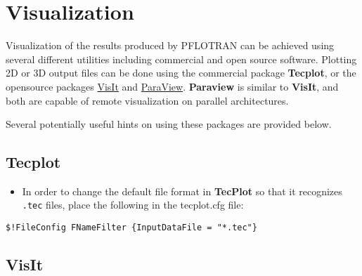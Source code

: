 
\section{Visualization}

Visualization of the results produced by PFLOTRAN can be achieved using several different utilities including commercial and open source software. 
Plotting 2D or 3D output files can be done using the commercial package {\bf Tecplot}, or the opensource packages \href{https://wci.llnl.gov/codes/visit/}{VisIt} and \href{http://www.paraview.org/}{ParaView}. {\bf Paraview} is similar to {\bf VisIt}, and both are capable of remote visualization on parallel architectures.  

Several potentially useful hints on using these packages are provided below.

\subsection{Tecplot}

\begin{itemize}
\item In order to change the default file format in {\bf TecPlot} so that it recognizes {\tt .tec} files, place the following in the tecplot.cfg file:
\end{itemize}

\small
\verb|$!FileConfig FNameFilter {InputDataFile = "*.tec"}|
\normalsize

\subsection{VisIt}

